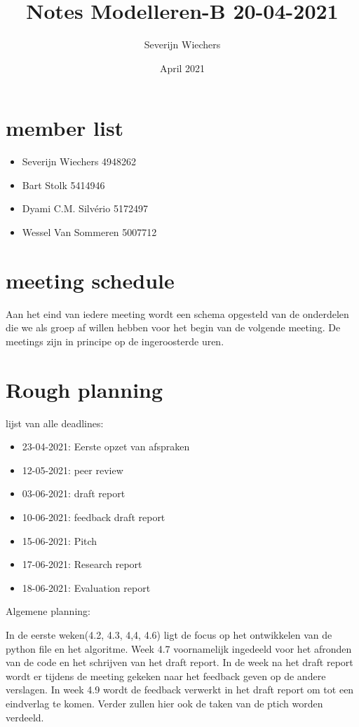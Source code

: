 \documentclass{article}
\title{Notes Modelleren-B 20-04-2021}
\author{Severijn Wiechers}
\date{April 2021}
\begin{document}
\maketitle

\section*{member list}

\begin{itemize}
    \item Severijn Wiechers 4948262
    \item Bart Stolk 5414946
    \item Dyami C.M. Silvério 5172497
    \item Wessel Van Sommeren 5007712
\end{itemize}


\section*{meeting schedule} 

Aan het eind van iedere meeting wordt een schema opgesteld van de onderdelen die we als groep af willen hebben voor het begin van de volgende meeting. De meetings zijn in principe op de ingeroosterde uren. 




\section*{Rough planning}
lijst van alle deadlines:
\begin{itemize}
    \item 23-04-2021: Eerste opzet van afspraken
    \item 12-05-2021: peer review
    \item 03-06-2021: draft report
    \item 10-06-2021: feedback draft report
    \item 15-06-2021: Pitch
    \item 17-06-2021: Research report
    \item 18-06-2021: Evaluation report 
\end{itemize}
Algemene planning:

In de eerste weken(4.2, 4.3, 4,4, 4.6) ligt de focus op het ontwikkelen van de python file en het algoritme. Week 4.7 voornamelijk ingedeeld voor het afronden van de code en het schrijven van het draft report. In de week na het draft report wordt er tijdens de meeting gekeken naar het feedback geven op de andere verslagen. In week 4.9 wordt de feedback verwerkt in het draft report om tot een eindverlag te komen. Verder zullen hier ook de taken van de ptich worden verdeeld.
\end{document}
